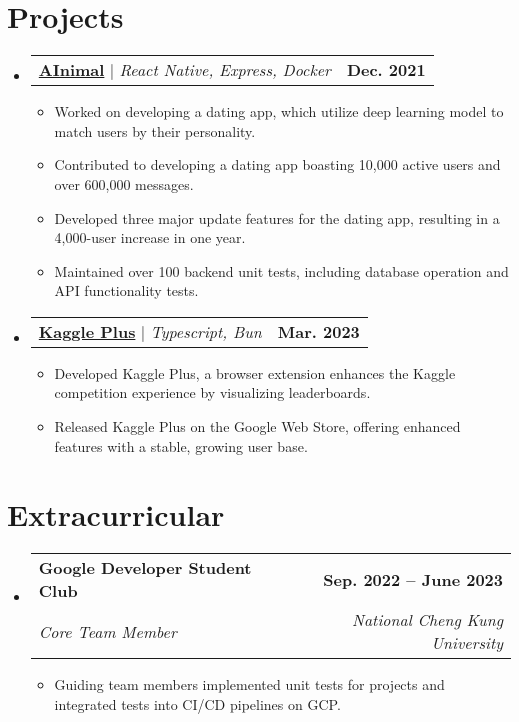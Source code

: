 \documentclass[letterpaper,11pt]{article}
\makeatletter
\newcommand{\resumeItem}[1]{
  \item\small{
    {#1 \vspace{-2pt}}
  }
}
\newcommand{\resumeSubheading}[4]{
  \vspace{-2pt}\item
    \begin{tabular*}{1.0\textwidth}[t]{l@{\extracolsep{\fill}}r}
      \textbf{#1} & \textbf{\small #2} \\
      \textit{\small#3} & \textit{\small #4} \\
    \end{tabular*}\vspace{-7pt}
}
\newcommand{\resumeProjectHeading}[2]{
    \item
    \begin{tabular*}{1.001\textwidth}{l@{\extracolsep{\fill}}r}
      \small#1 & \textbf{\small #2}\\
    \end{tabular*}\vspace{-7pt}
}
\newcommand{\resumeSubHeadingListStart}{\begin{itemize}[leftmargin=0.0in, label={}]}
\newcommand{\resumeSubHeadingListEnd}{\end{itemize}}
\newcommand{\resumeItemListStart}{\begin{itemize}}
\newcommand{\resumeItemListEnd}{\end{itemize}\vspace{-5pt}}
\makeatother
\begin{document}
\section{Projects}
    \vspace{-5pt}
    \resumeSubHeadingListStart
      \resumeProjectHeading
          {\href{https://official.ainimal.io/}{\textbf{AInimal}} $|$ \emph{React Native, Express, Docker}}{Dec. 2021}
          \resumeItemListStart
            \resumeItem{Worked on developing a dating app, which utilize deep learning model to match users by their personality.}
            \resumeItem{Contributed to developing a dating app boasting 10,000 active users and over 600,000 messages.}
            \resumeItem{Developed three major update features for the dating app, resulting in a 4,000-user increase in one year.}
            \resumeItem{Maintained over 100 backend unit tests, including database operation and API functionality tests.}
          \resumeItemListEnd
          \vspace{-13pt}
      \resumeProjectHeading
          {\href{https://github.com/eddielin0926/kaggle-plus}{\textbf{Kaggle Plus}} $|$ \emph{Typescript, Bun}}{Mar. 2023}
          \resumeItemListStart
            \resumeItem{Developed Kaggle Plus, a browser extension enhances the Kaggle competition experience by visualizing leaderboards.}
            \resumeItem{Released Kaggle Plus on the Google Web Store, offering enhanced features with a stable, growing user base.}
          \resumeItemListEnd 
    \resumeSubHeadingListEnd
\vspace{-15pt}

\section{Extracurricular}
    \resumeSubHeadingListStart
        \resumeSubheading{Google Developer Student Club}{Sep. 2022 -- June 2023}{Core Team Member}{National Cheng Kung University}
            \resumeItemListStart
                \resumeItem{Guiding team members implemented unit tests for projects and integrated tests into CI/CD pipelines on GCP.}
            \resumeItemListEnd
        
    \resumeSubHeadingListEnd
\vspace{-15pt}

\end{document}
